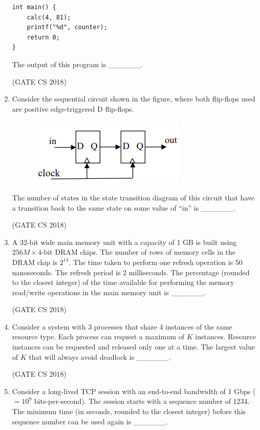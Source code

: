 \documentclass[12pt]{article}
\begin{document}
\begin{enumerate}
\begin{verbatim}
int main() {
    calc(4, 81);
    printf("%d", counter);
    return 0;
}
\end{verbatim}

The output of this program is \_\_\_\_\_\_.  

(GATE CS 2018)

\item Consider the sequential circuit shown in the figure, where both flip-flops used are positive edge-triggered D flip-flops.  

\begin{figure}[H]
    \centering
    \includegraphics[width=0.5\columnwidth]{figs/ass6_a_q22.png}
    \caption{}
    \label{fig:placeholder}
\end{figure}

The number of states in the state transition diagram of this circuit that have a transition back to the same state on some value of “in” is \_\_\_\_\_\_.  

(GATE CS 2018)

\item A 32-bit wide main memory unit with a capacity of 1 GB is built using $256M \times 4$-bit DRAM chips. The number of rows of memory cells in the DRAM chip is $2^{14}$. The time taken to perform one refresh operation is 50 nanoseconds. The refresh period is 2 milliseconds. The percentage (rounded to the closest integer) of the time available for performing the memory read/write operations in the main memory unit is \_\_\_\_\_\_.  

(GATE CS 2018)

\item Consider a system with 3 processes that share 4 instances of the same resource type. Each process can request a maximum of $K$ instances. Resource instances can be requested and released only one at a time. The largest value of $K$ that will always avoid deadlock is \_\_\_\_\_\_.  

(GATE CS 2018)

\item Consider a long-lived TCP session with an end-to-end bandwidth of 1 Gbps ($= 10^{9}$ bits-per-second). The session starts with a sequence number of 1234. The minimum time (in seconds, rounded to the closest integer) before this sequence number can be used again is \_\_\_\_\_\_.  


\end{enumerate}
\end{document}
